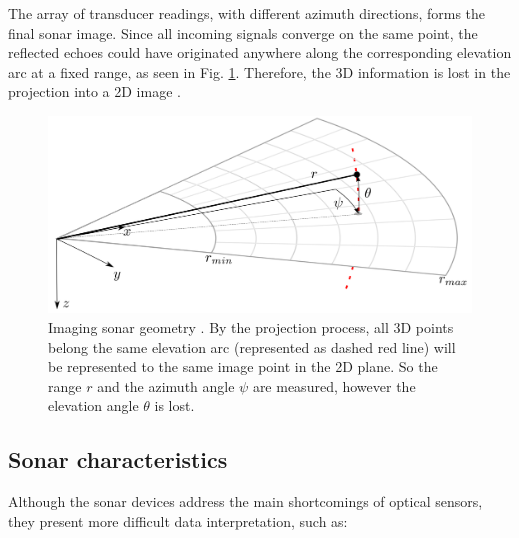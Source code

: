 \documentclass[final,5p,times]{elsarticle}
\begin{document}
The array of transducer readings, with different azimuth directions, forms the final sonar image. Since all incoming signals converge on the same point, the reflected echoes could have originated anywhere along the corresponding elevation arc at a fixed range, as seen in Fig. \ref{fig:sonar_geometry}. Therefore, the 3D information is lost in the projection into a 2D image \cite{huang2015}.


\begin{figure}[h]
    \includegraphics[width=\columnwidth]{figs/sonar_geometry}
    \centering
    \captionsetup{justification=centering}
    \caption{Imaging sonar geometry \cite{huang2015}. By the projection process, all 3D points belong the same elevation arc (represented as dashed red line) will be represented to the same image point in the 2D plane. So the range $r$ and the azimuth angle $\psi$ are measured, however the elevation angle $\theta$ is lost.}
    \label{fig:sonar_geometry}
\end{figure}


\subsection{Sonar characteristics}
\label{sonar:characteristics}

Although the sonar devices address the main shortcomings of optical sensors, they present more difficult data interpretation, such as:
\end{document}
